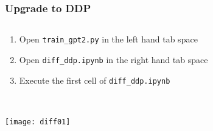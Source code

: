 \documentclass[
	notes=none,
	aspectratio=169
]{beamer}
\begin{document}

\begin{frame}
\frametitle{Upgrade to DDP}

\begin{columns}[T]
\begin{column}[T]{1.0\textwidth}
\setlength{\parskip}{0.5em}

\vspace{0.0cm}
\begin{enumerate}
\setlength{\parskip}{0.5em}
\item Open {\tt train\_gpt2.py} in the left hand tab space
\item Open {\tt diff\_ddp.ipynb} in the right hand tab space
\item Execute the first cell of {\tt diff\_ddp.ipynb}
\end{enumerate}

\end{column}
\end{columns}

\end{frame}
\note{
}


\begin{frame}
\frametitle{}

\begin{columns}[T]
\begin{column}[T]{1.0\textwidth}
\setlength{\parskip}{0.5em}

\vspace{0.0cm}
\texttt{[image: diff01]}


\end{column}
\end{columns}

\end{frame}
\note{
}

\end{document}
